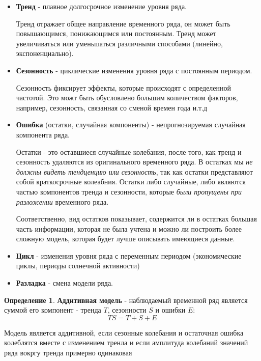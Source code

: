 \documentclass[aps,%
12pt,%
final,%
oneside,
onecolumn,%
musixtex, %
superscriptaddress,%
centertags]{article} %
\theoremstyle{plain}
\theoremstyle{definition}
\newtheorem{definition}{Определение}[subsection]
\theoremstyle{remark}
\begin{document}
\begin{itemize}
	\item \textbf{Тренд} - плавное долгосрочное изменение уровня ряда. 

	Тренд отражает общее направление временного ряда, он может быть повышающимся, понижающимся или постоянным. Тренд может увеличиваться или уменьшаться различными способами (линейно, экспоненциально).

	\item \textbf{Сезонность} - циклические изменения уровня ряда с постоянным периодом.

	Сезонность фиксирует эффекты, которые происходят с определенной частотой. Это можт быть обусловлено большим количеством факторов, например, сезонность, связанная со сменой времен года и.т.д

	\item \textbf{Ошибка} (остатки, случайная компоненты) - непрогнозируемая случайная компонента ряда.

	Остатки - это оставшиеся случайные колебания, после того, как тренд и сезонность удаляются из оригинального временного ряда. В остатках мы \textit{не должны видеть тендценцию или сезонность}, так как остатки представляют собой краткосрочные колеабния. Остатки либо случайные, либо являются частью компонентов тренда и сезонности, которые \textit{были пропущены при разложении} временного ряда.

	Соответственно, вид остатков показывает, содержится ли в остатках большая часть информации, которая не была учтена и можно ли построить более сложную модель, которая будет лучше описывать имеющиеся данные.

	\item \textbf{Цикл} - изменения уровня ряда с переменным периодом (экономические циклы, периоды солнечной активности)

	\item \textbf{Разладка} - смена модели ряда.
\end{itemize}

\begin{definition}
	\textbf{Аддитивная модель} - наблюдаемый временной ряд является суммой его компонент - тренда $T$, сезонности $S$ и ошибки $E$:
	$$TS = T + S + E$$

	Модель является аддитивной, если сезонные колебания и остаточная ошибка колеблятся вместе с изменением тренла и если амплитуда колебаний значений ряда вокргу тренда примерно одинаковая
\end{definition}
\end{document}
